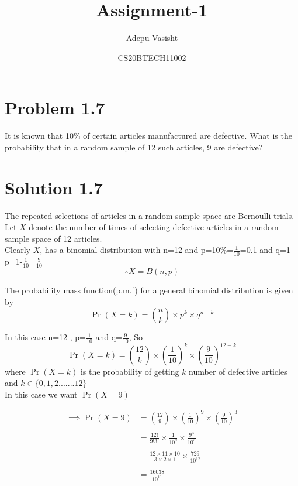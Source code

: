 \documentclass[journal,12pt,twocolumn]{IEEEtran}
\title{Assignment-1}
\author{Adepu Vasisht}
\date{CS20BTECH11002}
\providecommand{\brak}[1]{\ensuremath{\left(#1\right)}}
\begin{document}
\maketitle

\section*{Problem 1.7}
It is known that 10$\%$ of certain articles manufactured are defective. What is the probability that in a random sample of 12 such articles, 9 are defective?
\section*{Solution 1.7}
The repeated selections of articles in a random sample space are Bernoulli trials. Let $X$ denote the number of times of selecting defective articles in a random sample space of 12 articles.\\

Clearly $X$, has a binomial distribution with n=12 and p=10\%=$\frac{1}{10}$=0.1
and q=1-p=1-$\frac{1}{10}$=$\frac{9}{10}$\\

$$\therefore X = B \brak{n,p}$$

The probability mass function(p.m.f) for a general binomial distribution is given by $$\Pr \brak{X=k} = {n \choose k} \times p^k\times q^{n-k}$$

In this case n=12 , p=$\frac{1}{10}$ and q=$\frac{9}{10}$, So 
$$\Pr\brak{X=k}={12 \choose k}\times\brak{\frac{1}{10}}^k\times\brak{\frac{9}{10}}^{12-k}$$
where $\Pr\brak{X=k}$ is the probability of getting $k$ number of defective articles and $k\in \{0,1,2.......12\}$\\

In this case we want $\Pr\brak{X=9}$ 
    
\begin{align}
  \implies\Pr\brak{X=9} &={12 \choose 9}\times\brak{\frac{1}{10}}^9\times\brak{\frac{9}{10}}^{3} \\\nonumber\\  &=\frac{12!}{9!3!}\times\frac{1}{10^9}\times\frac{9^3}{10^3}\\\nonumber\\
  &=\frac{12\times11\times10}{3\times2\times1}\times\frac{729}{10^{12}}\\\nonumber\\
  &=\frac{16038}{10^{11}}\\\nonumber\\\nonumber
\end{align}
 
\end{document}
